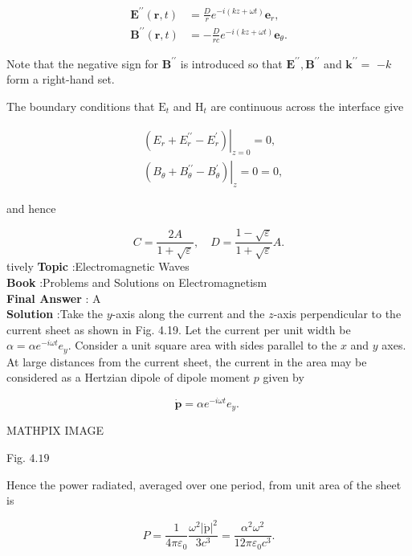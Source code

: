 \documentclass[10pt]{article}
\begin{document}
$$
\begin{aligned}
\mathbf{E}^{\prime \prime}(\mathbf{r}, t) &=\frac{D}{r} e^{-i(k z+\omega t)} \mathbf{e}_{r}, \\
\mathbf{B}^{\prime \prime}(\mathbf{r}, t) &=-\frac{D}{r c} e^{-i(k z+\omega t)} \mathbf{e}_{\theta} .
\end{aligned}
$$

Note that the negative sign for $\mathbf{B}^{\prime \prime}$ is introduced so that $\mathbf{E}^{\prime \prime}, \mathbf{B}^{\prime \prime}$ and $\mathbf{k}^{\prime \prime}=$ $-k$ form a right-hand set.

The boundary conditions that $\mathrm{E}_{t}$ and $\mathrm{H}_{t}$ are continuous across the interface give

$$
\begin{aligned}
&\left.\left(E_{r}+E_{r}^{\prime \prime}-E_{r}^{\prime}\right)\right|_{z=0}=0, \\
&\left.\left(B_{\theta}+B_{\theta}^{\prime \prime}-B_{\theta}^{\prime}\right)\right|_{z}=0=0,
\end{aligned}
$$

and hence

$$
C=\frac{2 A}{1+\sqrt{\varepsilon}}, \quad D=\frac{1-\sqrt{\varepsilon}}{1+\sqrt{\varepsilon}} A .
$$
tively
\textbf{Topic} :Electromagnetic Waves\\
\textbf{Book} :Problems and Solutions on Electromagnetism\\
\textbf{Final Answer} : A\\


\textbf{Solution} :Take the $y$-axis along the current and the $z$-axis perpendicular to the current sheet as shown in Fig. 4.19. Let the current per unit width be $\alpha=\alpha e^{-i \omega t} e_{y}$. Consider a unit square area with sides parallel to the $x$ and $y$ axes. At large distances from the current sheet, the current in the area may be considered as a Hertzian dipole of dipole moment $p$ given by

$$
\dot{\mathbf{p}}=\alpha e^{-i \omega t} e_{y} \text {. }
$$

MATHPIX IMAGE

Fig. $4.19$

Hence the power radiated, averaged over one period, from unit area of the sheet is

$$
P=\frac{1}{4 \pi \varepsilon_{0}} \frac{\omega^{2}|\dot{\mathrm{p}}|^{2}}{3 c^{3}}=\frac{\alpha^{2} \omega^{2}}{12 \pi \varepsilon_{0} c^{3}} .
$$
\end{document}
